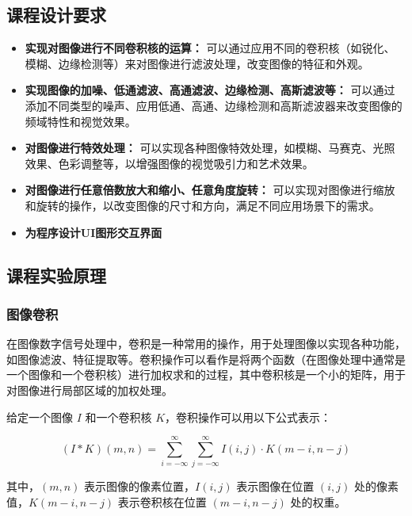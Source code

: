 \documentclass[a4paper,12pt]{article}
\begin{document}
\subsection{课程设计要求}
\begin{itemize}
    \item \textbf{实现对图像进行不同卷积核的运算：} 可以通过应用不同的卷积核（如锐化、模糊、边缘检测等）来对图像进行滤波处理，改变图像的特征和外观。
    
    \item \textbf{实现图像的加噪、低通滤波、高通滤波、边缘检测、高斯滤波等：} 可以通过添加不同类型的噪声、应用低通、高通、边缘检测和高斯滤波器来改变图像的频域特性和视觉效果。
    
    \item \textbf{对图像进行特效处理：} 可以实现各种图像特效处理，如模糊、马赛克、光照效果、色彩调整等，以增强图像的视觉吸引力和艺术效果。
    
    \item \textbf{对图像进行任意倍数放大和缩小、任意角度旋转：} 可以实现对图像进行缩放和旋转的操作，以改变图像的尺寸和方向，满足不同应用场景下的需求。

    \item \textbf{为程序设计UI图形交互界面}
\end{itemize}



\subsection{课程实验原理}
\subsubsection{图像卷积}
在图像数字信号处理中，卷积是一种常用的操作，用于处理图像以实现各种功能，如图像滤波、特征提取等。卷积操作可以看作是将两个函数（在图像处理中通常是一个图像和一个卷积核）进行加权求和的过程，其中卷积核是一个小的矩阵，用于对图像进行局部区域的加权处理。

给定一个图像 \( I \) 和一个卷积核 \( K \)，卷积操作可以用以下公式表示：

\begin{equation}
(I * K)(m, n) = \sum_{i=-\infty}^{\infty} \sum_{j=-\infty}^{\infty} I(i, j) \cdot K(m-i, n-j)
\end{equation}


其中，\( (m, n) \) 表示图像的像素位置，\( I(i, j) \) 表示图像在位置 \( (i, j) \) 处的像素值，\( K(m-i, n-j) \) 表示卷积核在位置 \( (m-i, n-j) \) 处的权重。
\end{document}
